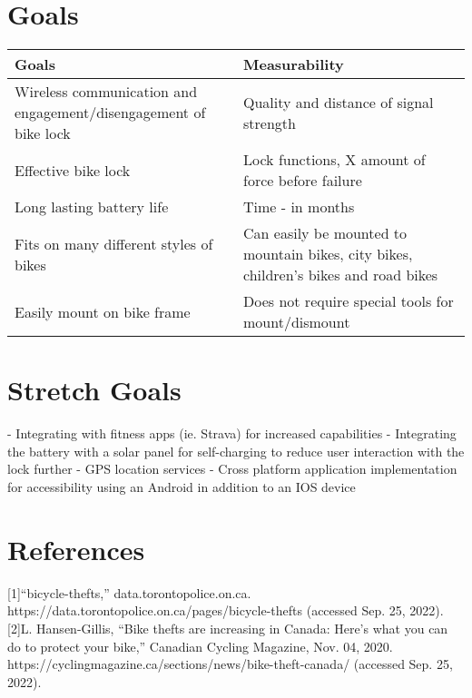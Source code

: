 \documentclass{article}
\begin{document}
\section{Goals}
\begin{table}[hp]
  \begin{center}
    \begin{tabular}{| p{0.5\linewidth} | p{0.5\linewidth} |}
    \hline
      \textbf{Goals} & \textbf{Measurability}\\
      \hline
      Wireless communication
      and engagement/disengagement of bike lock  & Quality and distance of signal strength\\
      \hline
      Effective bike lock  & Lock functions, X amount of force before failure\\
      \hline
      Long lasting battery life  & Time - in months \\
      \hline
      Fits on many different styles of bikes & Can easily be mounted to mountain bikes, city bikes, children's bikes and road bikes \\
      \hline
      Easily mount on bike frame & Does not require special tools for mount/dismount\\
      \hline
     
    \end{tabular}
  \end{center}
\end{table}

\section{Stretch Goals}
  - Integrating with fitness apps (ie. Strava) for increased capabilities
  - Integrating the battery with a solar panel for self-charging to reduce user interaction with the lock further
  - GPS location services
  - Cross platform application implementation for accessibility using an Android in addition to an IOS device
\section{References}

[1]“bicycle-thefts,” data.torontopolice.on.ca. https://data.torontopolice.on.ca/pages/bicycle-thefts (accessed Sep. 25, 2022).
[2]L. Hansen-Gillis, “Bike thefts are increasing in Canada: Here’s what you can do to protect your bike,” Canadian Cycling Magazine, Nov. 04, 2020. https://cyclingmagazine.ca/sections/news/bike-theft-canada/ (accessed Sep. 25, 2022).
‌
‌
\end{document}
